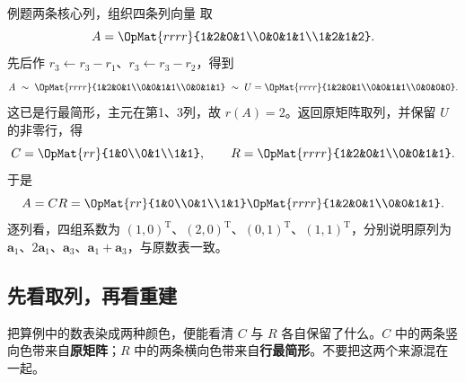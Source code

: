\documentclass[a4paper,12pt,twoside,openany,fontset=none]{ctexbook}
\newcounter{example}[chapter]
\newenvironment{example}[1][]{\begin{exBox}{例题}{#1}}{\end{exBox}}
\numberwithin{equation}{chapter}
\begin{document}

\begin{example}[两条核心列，组织四条列向量]
取
\[
 A=\OpMat{rrrr}{1&2&0&1\\0&0&1&1\\1&2&1&2}.
\]
先后作 $r_3\leftarrow r_3-r_1$、$r_3\leftarrow r_3-r_2$，得到
\[
 A\ \sim\ \OpMat{rrrr}{1&2&0&1\\0&0&1&1\\0&0&1&1}
 \ \sim\ U=\OpMat{rrrr}{1&2&0&1\\0&0&1&1\\0&0&0&0}.
\]
这已是行最简形，主元在第1、3列，故 $r(A)=2$。返回原矩阵取列，并保留 $U$ 的非零行，得
\[
 C=\OpMat{rr}{1&0\\0&1\\1&1},\qquad
 R=\OpMat{rrrr}{1&2&0&1\\0&0&1&1}.
\]
于是
\[
 A=CR=\OpMat{rr}{1&0\\0&1\\1&1}
        \OpMat{rrrr}{1&2&0&1\\0&0&1&1}.
\]
逐列看，四组系数为 $(1,0)^{\mathrm T}$、$(2,0)^{\mathrm T}$、$(0,1)^{\mathrm T}$、$(1,1)^{\mathrm T}$，分别说明原列为 $\boldsymbol a_1$、$2\boldsymbol a_1$、$\boldsymbol a_3$、$\boldsymbol a_1+\boldsymbol a_3$，与原数表一致。
\end{example}


\subsection*{先看取列，再看重建}

把算例中的数表染成两种颜色，便能看清 $C$ 与 $R$ 各自保留了什么。$C$ 中的两条竖向色带来自\textbf{原矩阵}；$R$ 中的两条横向色带来自\textbf{行最简形}。不要把这两个来源混在一起。
\end{document}

